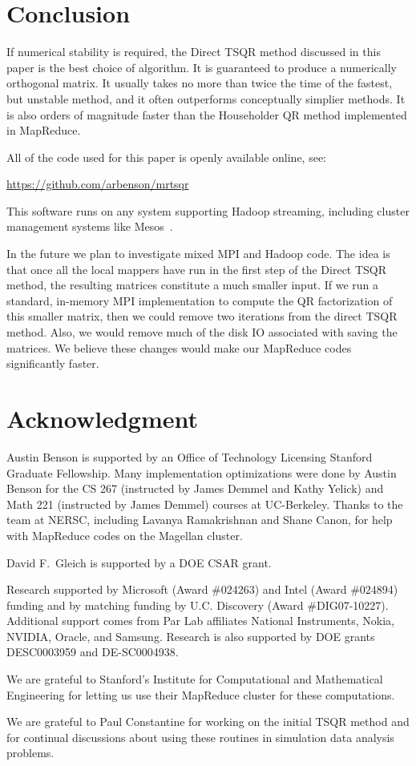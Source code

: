 \documentclass[10pt, conference, compsocconf]{IEEEtran}
\begin{document}
\section{Conclusion}

If numerical stability is required, the Direct TSQR method discussed in this paper is the best choice of algorithm.  It is guaranteed to produce a numerically orthogonal matrix.  It usually takes no more than twice the time of the fastest, but unstable method, and it often outperforms conceptually simplier methods. It is also orders of magnitude faster than the Householder QR method implemented in MapReduce. 

All of the code used for this paper is openly available online, see: \begin{center}
\url{https://github.com/arbenson/mrtsqr} \end{center}
This software runs on any system supporting Hadoop streaming, including cluster management systems like Mesos~\cite{Mesos2011}.  

In the future we plan to investigate mixed MPI and Hadoop code.  The idea is that once all the local mappers have run in the first step of the Direct TSQR method, the resulting  matrices constitute a much smaller input.  If we run a standard, in-memory MPI implementation to compute the QR factorization of this smaller matrix, then we could remove two iterations from the direct TSQR method.  Also, we would remove much of the disk IO associated with saving the  matrices.  We believe these changes would make our MapReduce codes significantly faster.

\section*{Acknowledgment}

Austin Benson is supported by an Office of Technology Licensing Stanford Graduate Fellowship.  Many implementation optimizations were done by Austin Benson for the CS 267 (instructed by James Demmel and Kathy Yelick) and Math 221 (instructed by James Demmel) courses at UC-Berkeley.  Thanks to the team at NERSC, including Lavanya Ramakrishnan and Shane Canon, for help with MapReduce codes on the Magellan cluster.

David F.~Gleich is supported by a DOE CSAR grant.

Research supported by Microsoft (Award \#024263) and Intel (Award \#024894) funding and by matching funding by U.C. Discovery (Award \#DIG07-10227). Additional support comes from Par Lab affiliates National Instruments, Nokia, NVIDIA, Oracle, and Samsung.  Research is also supported by DOE grants DESC0003959 and DE-SC0004938.

We are grateful to Stanford's Institute for Computational and Mathematical Engineering for letting us use their MapReduce cluster for these computations.

We are grateful to Paul Constantine for working on the initial TSQR method and for continual discussions about using these routines in simulation data analysis problems.



\end{document}
